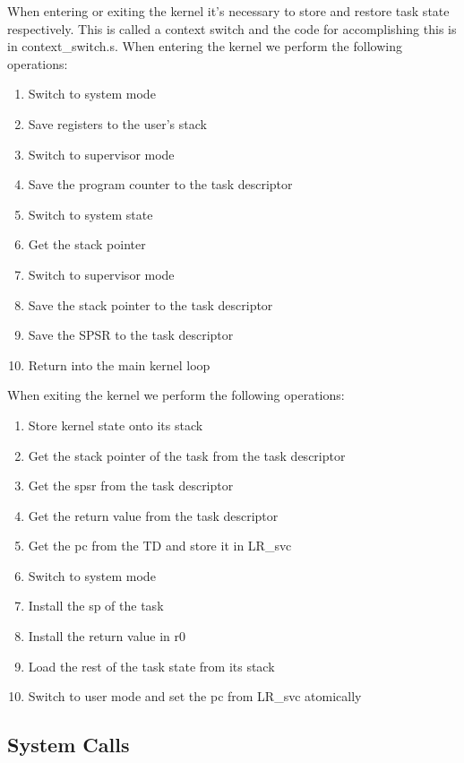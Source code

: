 \documentclass{article}
\begin{document}
When entering or exiting the kernel it's necessary to store and restore task state respectively. This is called a context switch and the code for accomplishing this is in context\_switch.s. When entering the kernel we perform the following operations:
\begin{enumerate}
  \item Switch to system mode
  \item Save registers to the user's stack
  \item Switch to supervisor mode
  \item Save the program counter to the task descriptor
  \item Switch to system state
  \item Get the stack pointer
  \item Switch to supervisor mode
  \item Save the stack pointer to the task descriptor
  \item Save the SPSR to the task descriptor
  \item Return into the main kernel loop
\end{enumerate}
When exiting the kernel we perform the following operations:
\begin{enumerate}
  \item Store kernel state onto its stack
  \item Get the stack pointer of the task from the task descriptor
  \item Get the spsr from the task descriptor
  \item Get the return value from the task descriptor
  \item Get the pc from the TD and store it in LR\_svc
  \item Switch to system mode
  \item Install the sp of the task
  \item Install the return value in r0
  \item Load the rest of the task state from its stack
  \item Switch to user mode and set the pc from LR\_svc atomically
\end{enumerate}

\subsection{System Calls}
\end{document}

